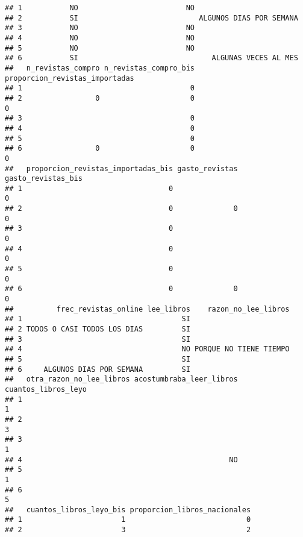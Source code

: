 \documentclass[
]{article}
\begin{document}
\begin{verbatim}
## 1           NO                         NO                        
## 2           SI                            ALGUNOS DIAS POR SEMANA
## 3           NO                         NO                        
## 4           NO                         NO                        
## 5           NO                         NO                        
## 6           SI                               ALGUNAS VECES AL MES
##   n_revistas_compro n_revistas_compro_bis proporcion_revistas_importadas
## 1                                       0                               
## 2                 0                     0                              0
## 3                                       0                               
## 4                                       0                               
## 5                                       0                               
## 6                 0                     0                              0
##   proporcion_revistas_importadas_bis gasto_revistas gasto_revistas_bis
## 1                                  0                                 0
## 2                                  0              0                  0
## 3                                  0                                 0
## 4                                  0                                 0
## 5                                  0                                 0
## 6                                  0              0                  0
##          frec_revistas_online lee_libros    razon_no_lee_libros
## 1                                     SI                       
## 2 TODOS O CASI TODOS LOS DIAS         SI                       
## 3                                     SI                       
## 4                                     NO PORQUE NO TIENE TIEMPO
## 5                                     SI                       
## 6     ALGUNOS DIAS POR SEMANA         SI                       
##   otra_razon_no_lee_libros acostumbraba_leer_libros cuantos_libros_leyo
## 1                                                                     1
## 2                                                                     3
## 3                                                                     1
## 4                                                NO                    
## 5                                                                     1
## 6                                                                     5
##   cuantos_libros_leyo_bis proporcion_libros_nacionales
## 1                       1                            0
## 2                       3                            2

\end{verbatim}
\end{document}
